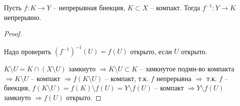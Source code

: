 \begin{theorem-non}\end{theorem-non}
Пусть $f : K \rightarrow Y$ -- непрерывная биекция, $K \subset X$ -- 
компакт. Тогда $f^{-1} : Y \rightarrow K$ непрерывно.

\begin{proof} $ $

    Надо проверить $(f^{-1})^{-1}(U) = f(U)$ открыто, если $U$ открыто.

    $K \setminus U = K \cap (X \setminus U)$ замкнуто $\Rightarrow 
    K \setminus U \subset K$ -- замкнутое подмн-во компакта $\Rightarrow
    K \setminus U$ -- компакт $\Rightarrow f(K \setminus U)$ -- компакт,
    т.к. $f$ непрерывна $\Rightarrow$ т.к. $f$ -- биекция, 
    $f(K \setminus U) = f(K) \setminus f(U) = Y \setminus f(U)$ -- 
    компакт $\Rightarrow Y \setminus f(U)$ замкнуто $\Rightarrow
    f(U)$ открыто. 
\end{proof}
